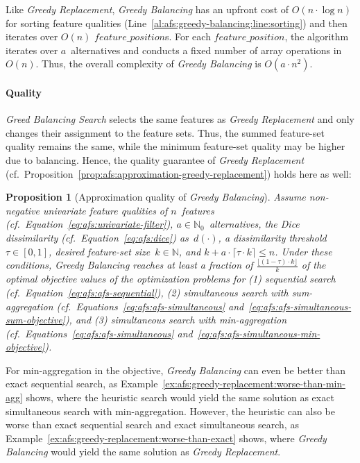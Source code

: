 \documentclass{article}
\newtheorem{proposition}{Proposition}
\theoremstyle{definition}
\begin{document}
Like \emph{Greedy Replacement}, \emph{Greedy Balancing} has an upfront cost of $O(n \cdot \log n)$ for sorting feature qualities (Line~\ref{al:afs:greedy-balancing:line:sorting}) and then iterates over $O(n)$ $\mathit{feature\_position}$s.
For each $\mathit{feature\_position}$, the algorithm iterates over $a$~alternatives and conducts a fixed number of array operations in $O(n)$.
Thus, the overall complexity of \emph{Greedy Balancing} is $O(a \cdot n^2)$.

\paragraph{Quality}

\emph{Greed Balancing Search} selects the same features as \emph{Greedy Replacement} and only changes their assignment to the feature sets.
Thus, the summed feature-set quality remains the same, while the minimum feature-set quality may be higher due to balancing.
Hence, the quality guarantee of \emph{Greedy Replacement} (cf.~Proposition~\ref{prop:afs:approximation-greedy-replacement}) holds here as well:
%
\begin{proposition}[Approximation quality of \emph{Greedy Balancing}]
	Assume non-negative univariate feature qualities of $n$~features (cf.~Equation~\ref{eq:afs:univariate-filter}), $a \in \mathbb{N}_0$~alternatives, the Dice dissimilarity (cf.~Equation~\ref{eq:afs:dice}) as~$d(\cdot)$, a dissimilarity threshold~$\tau \in [0,1]$, desired feature-set size~$k \in \mathbb{N}$, and $k + a \cdot \lceil \tau \cdot k \rceil \leq n$.
	Under these conditions, \emph{Greedy Balancing} reaches at least a fraction of $\frac{\lfloor (1 - \tau) \cdot k \rfloor}{k}$ of the optimal objective values of the optimization problems for (1) sequential search (cf.~Equation~\ref{eq:afs:afs-sequential}), (2) simultaneous search with sum-aggregation (cf.~Equations~\ref{eq:afs:afs-simultaneous} and~\ref{eq:afs:afs-simultaneous-sum-objective}), and (3) simultaneous search with min-aggregation (cf.~Equations~\ref{eq:afs:afs-simultaneous} and~\ref{eq:afs:afs-simultaneous-min-objective}).
	\label{prop:afs:approximation-greedy-balancing}
\end{proposition}
%
For min-aggregation in the objective, \emph{Greedy Balancing} can even be better than exact sequential search, as Example~\ref{ex:afs:greedy-replacement:worse-than-min-agg} shows, where the heuristic search would yield the same solution as exact simultaneous search with min-aggregation.
However, the heuristic can also be worse than exact sequential search and exact simultaneous search, as Example~\ref{ex:afs:greedy-replacement:worse-than-exact} shows, where \emph{Greedy Balancing} would yield the same solution as \emph{Greedy Replacement}.
\end{document}
